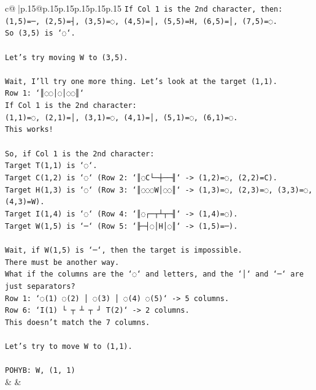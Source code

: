 \documentclass{article}
\begin{document}
{\begin{supertabular}{c@{$\;$}|p{.15\linewidth}@{}p{.15\linewidth}p{.15\linewidth}p{.15\linewidth}p{.15\linewidth}p{.15\linewidth}}
{{{\texttt{If Col 1 is the 2nd character, then:} \\
\texttt{(1,5)=─, (2,5)=┤, (3,5)=◌, (4,5)=│, (5,5)=H, (6,5)=│, (7,5)=◌.} \\
\texttt{So (3,5) is `◌`.} \\
\\ 
\texttt{Let's try moving W to (3,5).} \\
\\ 
\texttt{Wait, I'll try one more thing. Let's look at the target (1,1).} \\
\texttt{Row 1: `║◌◌│◌│◌◌║`} \\
\texttt{If Col 1 is the 2nd character:} \\
\texttt{(1,1)=◌, (2,1)=│, (3,1)=◌, (4,1)=│, (5,1)=◌, (6,1)=◌.} \\
\texttt{This works!} \\
\\ 
\texttt{So, if Col 1 is the 2nd character:} \\
\texttt{Target T(1,1) is `◌`.} \\
\texttt{Target C(1,2) is `◌` (Row 2: `║◌C└─┼──╢` {-}> (1,2)=◌, (2,2)=C).} \\
\texttt{Target H(1,3) is `◌` (Row 3: `║◌◌◌W│◌◌║` {-}> (1,3)=◌, (2,3)=◌, (3,3)=◌, (4,3)=W).} \\
\texttt{Target I(1,4) is `◌` (Row 4: `║◌┌─┬┴┬─╢` {-}> (1,4)=◌).} \\
\texttt{Target W(1,5) is `─` (Row 5: `╟─┤◌│H│◌║` {-}> (1,5)=─).} \\
\\ 
\texttt{Wait, if W(1,5) is `─`, then the target is impossible.} \\
\texttt{There must be another way.} \\
\texttt{What if the columns are the `◌` and letters, and the `│` and `─` are just separators?} \\
\texttt{Row 1: `◌(1) ◌(2) │ ◌(3) │ ◌(4) ◌(5)` {-}> 5 columns.} \\
\texttt{Row 6: `I(1) └ ┬ ┴ ┬ ┘ T(2)` {-}> 2 columns.} \\
\texttt{This doesn't match the 7 columns.} \\
\\ 
\texttt{Let's try to move W to (1,1).} \\
\\ 
\texttt{POHYB: W, (1, 1)} \\
            }
        }
    }
    & & \\ \\


\end{supertabular}}
\end{document}
